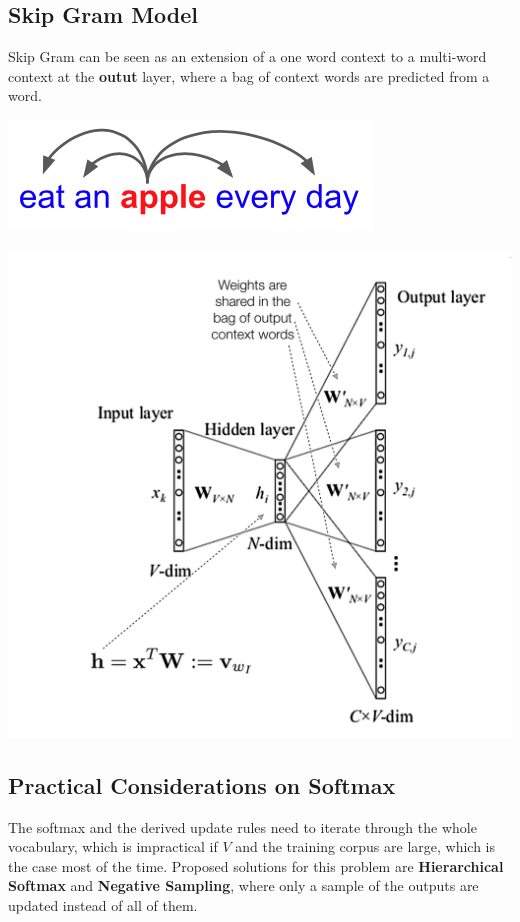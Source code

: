 \documentclass[11pt]{article}
\begin{document}
\subsection{Skip Gram Model}
\begin{minipage}{0.5\linewidth}
	Skip Gram can be seen as an extension of a one word context to a multi-word context at the \textbf{outut} layer, where a bag of context words are predicted from a word.
	
	\begin{center}
		\includegraphics[width=0.6\linewidth]{skip_gram_context}
	\end{center}
\end{minipage}
\begin{minipage}{0.5\linewidth}
	\centering
	\includegraphics[width=\linewidth]{skip_gram}
\end{minipage}

\subsection{Practical Considerations on Softmax}
The softmax and the derived update rules need to iterate through the whole vocabulary, which is impractical if $V$ and the training corpus are large, which is the case most of the time. Proposed solutions for this problem are \textbf{Hierarchical Softmax} and \textbf{Negative Sampling}, where only a sample of the outputs are updated instead of all of them.
\end{document}
